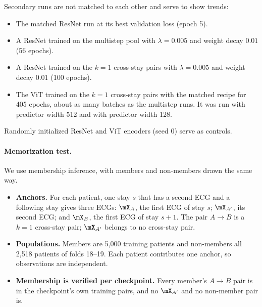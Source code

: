 Secondary runs are not matched to each other and serve to show trends:
\begin{itemize}
\item The matched ResNet run at its best validation loss (epoch 5).
\item A ResNet trained on the multistep pool with $\lambda=0.005$ and weight decay $0.01$ (56 epochs).
\item A ResNet trained on the $k=1$ cross-stay pairs with $\lambda=0.005$ and weight decay $0.01$ (100 epochs).
\item The ViT trained on the $k=1$ cross-stay pairs with the matched recipe for 405 epochs, about as many batches as the multistep runs. It was run with predictor width 512 and with predictor width 128.
\end{itemize}

Randomly initialized ResNet and ViT encoders (seed 0) serve as controls.

\paragraph{Memorization test.} We use membership inference, with members and non-members drawn the same way.
\begin{itemize}
\item \textbf{Anchors.} For each patient, one stay $s$ that has a second ECG and a following stay gives three ECGs: $\mX_A$, the first ECG of stay $s$; $\mX_{A'}$, its second ECG; and $\mX_B$, the first ECG of stay $s+1$. The pair $A\to B$ is a $k=1$ cross-stay pair; $\mX_{A'}$ belongs to no cross-stay pair.
\item \textbf{Populations.} Members are 5{,}000 training patients and non-members all 2{,}518 patients of folds 18--19. Each patient contributes one anchor, so observations are independent.
\item \textbf{Membership is verified per checkpoint.} Every member's $A\to B$ pair is in the checkpoint's own training pairs, and no $\mX_{A'}$ and no non-member pair is.
\end{itemize}

